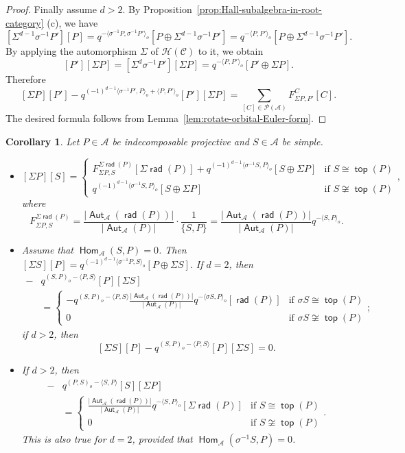 \documentclass[reqno,12pt,a4paper]{amsart}
\newtheorem{corollary}[theorem]{Corollary}
\theoremstyle{remark}
\theoremstyle{definition}
\newcommand{\opname}[1]{\operatorname{\mathsf{#1}}}
\newcommand{\rad}{\opname{rad}\nolimits}
\renewcommand{\top}{\opname{top}\nolimits}
\newcommand{\Hom}{\opname{Hom}}
\newcommand{\Aut}{\opname{Aut}}
\newcommand{\ca}{{\mathcal A}}
\newcommand{\cc}{{\mathcal C}}
\newcommand{\ch}{{\mathcal H}}
\newcommand{\cp}{{\mathcal P}}
\numberwithin{equation}{section}
\begin{document}
\begin{proof}
Finally assume $d>2$. By Proposition~\ref{prop:Hall-subalgebra-in-root-category} (c), we have
\[
[\Sigma^{d-1}\sigma^{-1}P'][P]=q^{-\langle \sigma^{-1}P,\sigma^{-1}P'\rangle_o}[P\oplus\Sigma^{d-1} \sigma^{-1}P']=q^{-\langle P,P'\rangle_o}[P\oplus\Sigma^{d-1} \sigma^{-1}P'].
\]
By applying the automorphism $\Sigma$ of $\ch(\cc)$ to it, we obtain
\[
[P'][\Sigma P]=[\Sigma^{d}\sigma^{-1}P'][\Sigma P]=q^{-\langle P,P'\rangle_o}[P'\oplus\Sigma P].
\]
Therefore
\[
[\Sigma P][P']-q^{(-1)^{d-1}\langle\sigma^{-1}P',P\rangle_o+\langle P,P'\rangle_o}[P'][\Sigma P]=
\sum_{[C]\in\cp(\ca)}F_{\Sigma P,P'}^C[C].
\]
The desired formula follows from Lemma~\ref{lem:rotate-orbital-Euler-form}.
\end{proof}

\begin{corollary}
\label{cor:commutator-for-neighbouring-pieces-projective-simple}
Let $P\in\ca$ be indecomposable projective and $S\in\ca$ be simple.
\begin{itemize}
\item[(a)]  $
[\Sigma P][S]=\begin{cases}
F_{\Sigma P,S}^{\Sigma\rad(P)}[\Sigma\rad(P)]+q^{(-1)^{d-1}\langle \sigma^{-1}S,P\rangle_o}[S\oplus\Sigma P] & \text{if }S\cong\top(P)\\
q^{(-1)^{d-1}\langle \sigma^{-1}S,P\rangle_o}[S\oplus\Sigma P] & \text{if }S\not\cong \top(P)
\end{cases},
$
where
\[
F_{\Sigma P,S}^{\Sigma\rad(P)}=\frac{|\Aut_\ca(\rad(P))|}{|\Aut_\ca(P)|}\cdot\frac{1}{\{S,P\}}=\frac{|\Aut_\ca(\rad(P))|}{|\Aut_\ca(P)|}q^{-\langle S,P\rangle_o}.
\]
\item[(b)] Assume that $\Hom_\ca(S,P)=0$. Then
$
[\Sigma S][P]=q^{(-1)^{d-1}\langle \sigma^{-1}P,S\rangle_o}[P\oplus\Sigma S].
$
If $d=2$, then
\begin{align*}
[\Sigma S][P]-&q^{(S,P)_o-\langle P,S\rangle}[P][\Sigma S]\\
&=
\begin{cases} -q^{(S,P)_o-\langle P,S\rangle}\frac{|\Aut_\ca(\rad(P))|}{|\Aut_\ca(P)|}q^{-\langle \sigma S,P\rangle_o}[\rad(P)] &\text{if }\sigma S\cong \top(P)\\
0 & \text{if }\sigma S\not\cong\top(P)
\end{cases};
\end{align*}
if $d>2$, then
\[
[\Sigma S][P]-q^{(S,P)_o-\langle P,S\rangle}[P][\Sigma S]=0.
\]

\item[(c)]  If $d>2$, then
\begin{align*}
[\Sigma P][S]-&q^{(P,S)_o-\langle S,P\rangle}[S][\Sigma P]\\
&=
\begin{cases} \frac{|\Aut_\ca(\rad(P))|}{|\Aut_\ca(P)|}q^{-\langle S,P\rangle_o}[\Sigma \rad(P)] & \text{if }S\cong \top(P)\\
0 &\text{if }S\not\cong \top(P)
\end{cases}.
\end{align*}
This is also true for $d=2$, provided that $\Hom_\ca(\sigma^{-1}S,P)=0$.
\end{itemize}
\end{corollary}
\end{document}
